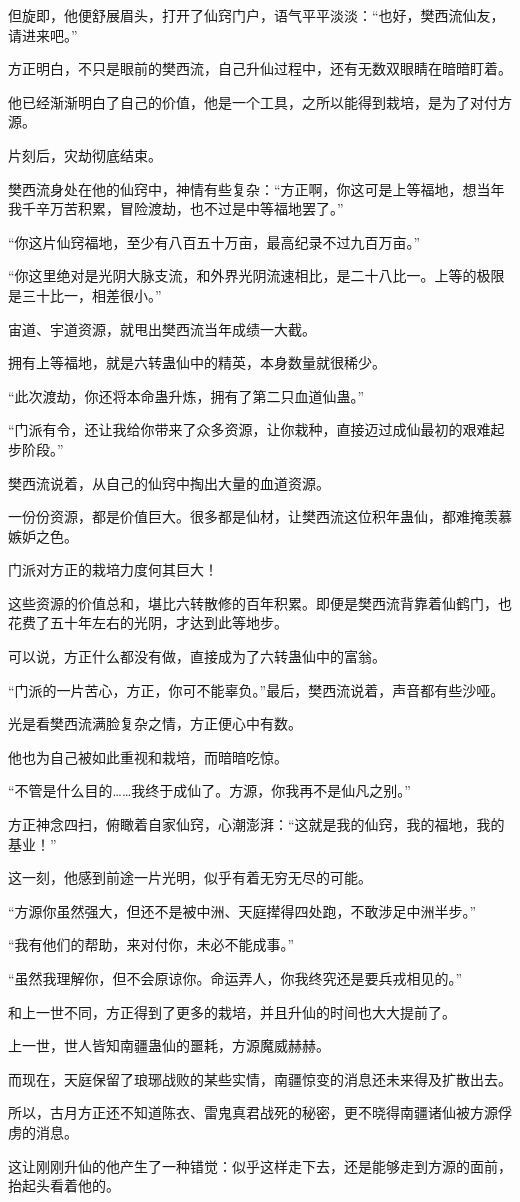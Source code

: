 \begin{this_body}
但旋即，他便舒展眉头，打开了仙窍门户，语气平平淡淡：“也好，樊西流仙友，请进来吧。”

方正明白，不只是眼前的樊西流，自己升仙过程中，还有无数双眼睛在暗暗盯着。

他已经渐渐明白了自己的价值，他是一个工具，之所以能得到栽培，是为了对付方源。

片刻后，灾劫彻底结束。

樊西流身处在他的仙窍中，神情有些复杂：“方正啊，你这可是上等福地，想当年我千辛万苦积累，冒险渡劫，也不过是中等福地罢了。”

“你这片仙窍福地，至少有八百五十万亩，最高纪录不过九百万亩。”

“你这里绝对是光阴大脉支流，和外界光阴流速相比，是二十八比一。上等的极限是三十比一，相差很小。”

宙道、宇道资源，就甩出樊西流当年成绩一大截。

拥有上等福地，就是六转蛊仙中的精英，本身数量就很稀少。

“此次渡劫，你还将本命蛊升炼，拥有了第二只血道仙蛊。”

“门派有令，还让我给你带来了众多资源，让你栽种，直接迈过成仙最初的艰难起步阶段。”

樊西流说着，从自己的仙窍中掏出大量的血道资源。

一份份资源，都是价值巨大。很多都是仙材，让樊西流这位积年蛊仙，都难掩羡慕嫉妒之色。

门派对方正的栽培力度何其巨大！

这些资源的价值总和，堪比六转散修的百年积累。即便是樊西流背靠着仙鹤门，也花费了五十年左右的光阴，才达到此等地步。

可以说，方正什么都没有做，直接成为了六转蛊仙中的富翁。

“门派的一片苦心，方正，你可不能辜负。”最后，樊西流说着，声音都有些沙哑。

光是看樊西流满脸复杂之情，方正便心中有数。

他也为自己被如此重视和栽培，而暗暗吃惊。

“不管是什么目的……我终于成仙了。方源，你我再不是仙凡之别。”

方正神念四扫，俯瞰着自家仙窍，心潮澎湃：“这就是我的仙窍，我的福地，我的基业！”

这一刻，他感到前途一片光明，似乎有着无穷无尽的可能。

“方源你虽然强大，但还不是被中洲、天庭撵得四处跑，不敢涉足中洲半步。”

“我有他们的帮助，来对付你，未必不能成事。”

“虽然我理解你，但不会原谅你。命运弄人，你我终究还是要兵戎相见的。”

和上一世不同，方正得到了更多的栽培，并且升仙的时间也大大提前了。

上一世，世人皆知南疆蛊仙的噩耗，方源魔威赫赫。

而现在，天庭保留了琅琊战败的某些实情，南疆惊变的消息还未来得及扩散出去。

所以，古月方正还不知道陈衣、雷鬼真君战死的秘密，更不晓得南疆诸仙被方源俘虏的消息。

这让刚刚升仙的他产生了一种错觉：似乎这样走下去，还是能够走到方源的面前，抬起头看着他的。

\end{this_body}

